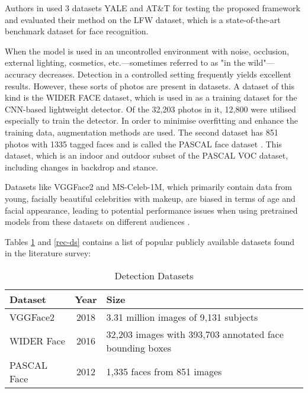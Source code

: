 Authors in \cite{abuzneid_enhanced_2018} used 3 datasets YALE and AT\&T for testing the proposed framework and evaluated their method on the LFW dataset, which is a state-of-the-art benchmark dataset for face recognition.

When the model is used in an uncontrolled environment with noise, occlusion, external lighting, cosmetics, etc.—sometimes referred to as "in the wild"—accuracy decreases. Detection in a controlled setting frequently yields excellent results. However, these sorts of photos are present in datasets. A dataset of this kind is the WIDER FACE dataset, which is used in \cite{putro_high_2021} as a training dataset for the CNN-based lightweight detector. Of the 32,203 photos in it, 12,800 were utilised especially to train the detector. In order to minimise overfitting and enhance the training data, augmentation methods are used. The second dataset has 851 photos with 1335 tagged faces and is called the PASCAL face dataset \cite{putro_high_2021}. This dataset, which is an indoor and outdoor subset of the PASCAL VOC dataset, including changes in backdrop and stance.

Datasets like VGGFace2 and MS-Celeb-1M, which primarily contain data from young, facially beautiful celebrities with makeup, are biased in terms of age and facial appearance, leading to potential performance issues when using pretrained models from these datasets on different audiences \cite{wanyonyi_open-source_2022}.

Tables \ref{det-ds} and \ref{rec-ds} contains a list of popular publicly available datasets found in the literature survey:

\begin{table}[htbp]
\caption{Detection Datasets}
\begin{center}
\begin{tabularx}{\columnwidth}{|X|c|X|}
\hline
\textbf{Dataset} & \textbf{Year}& \textbf{Size} \\
\hline
VGGFace2 \cite{kim_face_2022} & 2018 & 3.31 million images of 9,131 subjects \\
\hline
WIDER Face \cite{kim_face_2022} & 2016 & 32,203 images with 393,703 annotated face bounding boxes \\
\hline
PASCAL Face \cite{feng_detect_2022} & 2012 & 1,335 faces from 851 images \\
\hline
\end{tabularx}
\label{det-ds}
\end{center}
\end{table}
    
